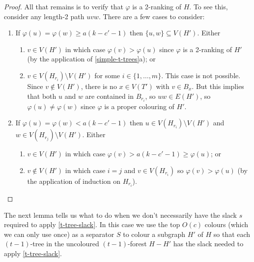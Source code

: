 \documentclass[kpfonts]{patmorin}
\theoremstyle{named}
\newcommand{\weirdref}[2]{\cref{#1}#2}
\begin{document}
\begin{proof}
   All that remains is to verify that $\varphi$ is a 2-ranking of $H$. To see this, consider any length-2 path $uvw$.  There are a few cases to consider:
   \begin{enumerate}
    \item If $\varphi(u)=\varphi(w) \ge a(k-c'-1)$ then $\{u,w\}\subseteq V(H')$. Either
    \begin{enumerate}
       \item $v\in V(H')$ in which case $\varphi(v)>\varphi(u)$ since $\varphi$ is a 2-ranking of $H'$ (by the application of \weirdref{simple-t-trees}{a}); or
       \item $v\in V(H_{r_i})\setminus V(H')$ for some $i\in\{1,\ldots,m\}$.  This case is not possible.  Since $v\not\in V(H')$, there is no $x\in V(T')$ with $v\in B_x$.  But this implies that both $u$ and $w$ are contained in $B_{r_i}$, so $uw\in E(H')$, so $\varphi(u)\neq\varphi(w)$ since $\varphi$ is a proper colouring of $H'$.
   \end{enumerate}
   \item If $\varphi(u)=\varphi(w) < a(k-c'-1)$ then $u\in V(H_{r_i})\setminus V(H')$ and $w\in V(H_{r_j})\setminus V(H')$.  Either
   \begin{enumerate}
    \item $v\in V(H')$ in which case $\varphi(v)>a(k-c'-1)\ge\varphi(u)$; or
    \item $v\not\in V(H')$ in which case $i=j$ and $v\in V(H_{r_i})$ so $\varphi(v)>\varphi(u)$ (by the application of induction on $H_{r_i}$). \qedhere
    \end{enumerate}
   \end{enumerate}
\end{proof}

The next lemma tells us what to do when we don't necessarily have the slack $s$ required to apply \cref{t-tree-slack}.  In this case we use the top $O(c)$ colours (which we can only use once) as a separator $S$ to colour a subgraph $H'$ of $H$ so that each $(t-1)$-tree in the uncoloured $(t-1)$-forest $H-H'$ has the slack needed to apply \cref{t-tree-slack}.
\end{document}
